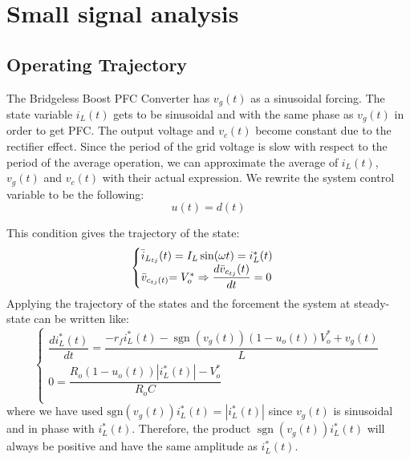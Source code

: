 \documentclass[DIV=calc, paper=a4, fontsize=11pt, twocolumn]{scrartcl}	 %
\begin{document}
\section{Small signal analysis}
\subsection{Operating Trajectory}
The Bridgeless Boost PFC Converter has $v_g(t)$ as a sinusoidal forcing. The state variable  $i_L(t)$ gets to be sinusoidal and with the same phase as $v_g(t)$ in order to get PFC. The output voltage and $v_c(t)$ become constant due to the rectifier effect. Since the period of the grid voltage is slow with respect to the period of the average operation, we can approximate the average of $i_L(t)$, $v_g(t)$ and  $v_c(t)$ with their actual expression.
We rewrite the system control variable to be the following:
\begin{equation}
u(t)=d(t)
\end{equation}

This condition gives the trajectory of the state:
\begin{equation}
\begin{cases}
$$\bar{i}_{L_{tj}}$$ (t) = I_L \sin($$\omega$$t) = i^*_L(t)\\
$$\bar{v}_{c_{tj}(t)}$$ = V^*_{o } \Rightarrow \dfrac{d \bar{v}_{c_{tj}}(t)}{dt} = 0
\end{cases}
\end{equation}
Applying the trajectory of the states and the forcement the system at steady-state can be written like:
{\small
\begin{equation}\label{eq:steady-state}
\begin{cases} 
\dfrac{d i^*_L(t)}{dt} = \dfrac{-r_f i^*_L(t) - \operatorname{sgn}(v_g(t)) ( 1- u_o(t)) V^*_{o} + v_g(t)}{L} \\[16pt]
0 = \dfrac{R_o ( 1- u_o(t))|i^*_L(t)| - V^*_{o}}{R_oC} \\[16pt]

\end{cases}
\end{equation}
}
where we have used $\text{sgn}(v_g(t)) i^*_L(t) = |i^*_L(t)|$ since $v_g(t)$ is sinusoidal and in phase with $i^*_L(t)$. Therefore, the product $\operatorname{sgn}(v_g(t))i^*_L(t)$ will always be positive and have the same amplitude as $i^*_L(t)$.
\end{document}

